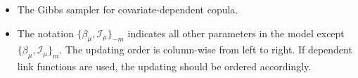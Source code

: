 \documentclass{beamer}
\begin{document}
\begin{frame}[allowframebreaks]
  \begin{itemize}
  \item The Gibbs sampler for covariate-dependent copula.
  \item The notation $\{\beta_{\mu},\mathcal{I}_{\mu}\}_{-m}$ indicates all other
    parameters in the model except $\{\beta_{\mu},\mathcal{I}_{\mu}\}_{m}$. The updating
    order is column-wise from left to right. If dependent link functions are used, the
    updating should be ordered accordingly.
  \end{itemize}
  \begin{table}
    \label{tab:gibbs}
    \centering
\end{table}
\end{frame}
\end{document}
